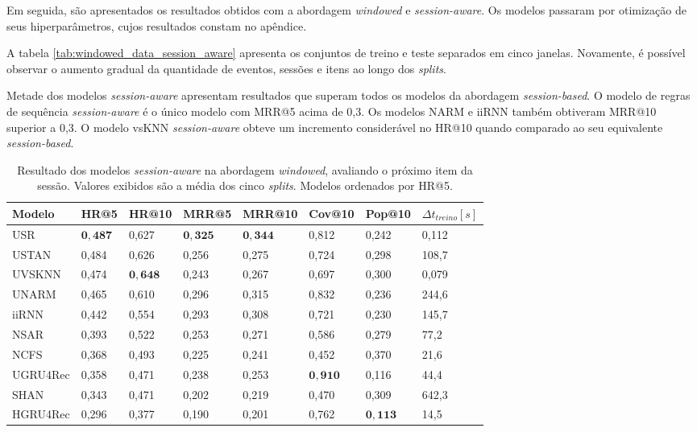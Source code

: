 Em seguida, são apresentados os resultados obtidos com a abordagem
\textit{windowed} e \textit{session-aware}. Os modelos passaram por otimização
de seus hiperparâmetros, cujos resultados constam no apêndice.

A tabela \ref{tab:windowed_data_session_aware} apresenta os conjuntos de treino
e teste separados em cinco janelas. Novamente, é possível observar o aumento
gradual da quantidade de eventos, sessões e itens ao longo dos \textit{splits}.

Metade dos modelos \textit{session-aware} apresentam resultados que superam
todos os modelos da abordagem \textit{session-based}. O modelo de regras de
sequência \textit{session-aware} é o único modelo com MRR@5 acima de 0,3. Os
modelos NARM e iiRNN também obtiveram MRR@10 superior a 0,3. O modelo vsKNN
\textit{session-aware} obteve um incremento considerável no HR@10 quando
comparado ao seu equivalente \textit{session-based}.

\begin{table}[htbp]
  \begin{tabular}{|l|l|l|l|l|l|l|l|}
    \hline
    Modelo & HR@5 & HR@10 & MRR@5 & MRR@10 & Cov@10 & Pop@10 & $\Delta t_{treino} [s]$ \\
    \hline
    USR & $\mathbf{0,487}$ & 0,627 & $\mathbf{0,325}$ & $\mathbf{0,344}$ & 0,812 & 0,242 & 0,112 \\
    \hline
    USTAN & 0,484 & 0,626 & 0,256 & 0,275 & 0,724 & 0,298 & 108,7 \\
    \hline
    UVSKNN & 0,474 & $\mathbf{0,648}$ & 0,243 & 0,267 & 0,697 & 0,300 & 0,079 \\
    \hline
    UNARM & 0,465 & 0,610 & 0,296 & 0,315 & 0,832 & 0,236 & 244,6 \\
    \hline
    iiRNN & 0,442 & 0,554 & 0,293 & 0,308 & 0,721 & 0,230 & 145,7 \\
    \hline
    NSAR & 0,393 & 0,522 & 0,253 & 0,271 & 0,586 & 0,279 & 77,2 \\
    \hline
    NCFS & 0,368 & 0,493 & 0,225 & 0,241 & 0,452 & 0,370 & 21,6 \\
    \hline
    UGRU4Rec & 0,358 & 0,471 & 0,238 & 0,253 & $\mathbf{0,910}$ & 0,116 & 44,4 \\
    \hline
    SHAN & 0,343 & 0,471 & 0,202 & 0,219 & 0,470 & 0,309 & 642,3 \\
    \hline
    HGRU4Rec & 0,296 & 0,377 & 0,190 & 0,201 & 0,762 & $\mathbf{0,113}$ & 14,5 \\
    \hline
    \end{tabular}
  \caption{Resultado dos modelos \textit{session-aware} na abordagem
  \textit{windowed}, avaliando o próximo item da sessão. Valores exibidos são a
  média dos cinco \textit{splits}. Modelos ordenados por HR@5. }
\end{table}
\newpage


